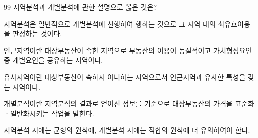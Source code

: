 \begin{question}{99}
지역분석과 개별분석에 관한 설명으로 옳은 것은?
\begin{choices}
  \item 지역분석은 일반적으로 개별분석에 선행하여 행하는 것으로 그 지역 내의 최유효이용을 판정하는 것이다.
  \item 인근지역이란 대상부동산이 속한 지역으로 부동산의 이용이 동질적이고 가치형성요인 중 개별요인을 공유하는 지역이다.
  \item 유사지역이란 대상부동산이 속하지 아니하는 지역으로서 인근지역과 유사한 특성을 갖는 지역이다.
  \item 개별분석이란 지역분석의 결과로 얻어진 정보를 기준으로 대상부동산의 가격을 표준화ㆍ일반화시키는 작업을 말한다.
  \item 지역분석 시에는 균형의 원칙에, 개별분석 시에는 적합의 원칙에 더 유의하여야 한다.
\end{choices}
\end{question}
